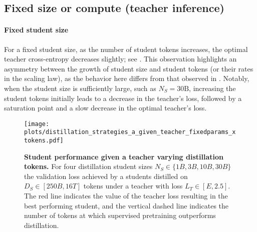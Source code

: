 \FloatBarrier
\clearpage

\subsection{Fixed size or compute (teacher inference)}
\label{ssec:fixed-tokens-or-compute-teacher-inference-app}

\paragraph{Fixed student size} For a fixed student size, as the number of student tokens increases, the optimal teacher cross-entropy decreases slightly; see . This observation highlights an asymmetry between the growth of student size and student tokens (or their rates in the scaling law), as the behavior here differs from that observed in . Notably, when the student size is sufficiently large, such as $N_S = 30\text{B}$, increasing the student tokens initially leads to a decrease in the teacher's loss, followed by a saturation point and a slow decrease in the optimal teacher's loss.

\begin{figure}[h]
	\centering
	\texttt{[image: plots/distillation\_strategies\_a\_given\_teacher\_fixedparams\_xtokens.pdf]}
	\caption{\textbf{Student performance given a teacher varying distillation tokens.}
		For four distillation student sizes
		$N_S\in\{1B, 3B, 10B, 30B\}$
		the validation loss achieved by a students distilled on $D_S\in[250B,16T]$ tokens under a teacher with loss $L_T\in[E,2.5]$.
		The red line indicates the value of the teacher loss resulting in the best performing student, and the vertical dashed line indicates the number of tokens at which supervised pretraining outperforms distillation.
	}
	\label{fig:distillation-strategies-a-fixedparams-tokens}
\end{figure}

\FloatBarrier
